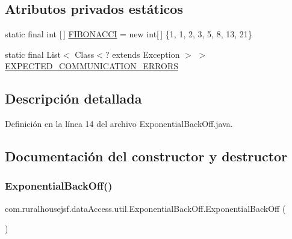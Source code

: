\subsection*{Atributos privados estáticos}
\begin{DoxyCompactItemize}
\item 
static final int \mbox{[}$\,$\mbox{]} \mbox{\hyperlink{classcom_1_1ruralhousejsf_1_1data_access_1_1util_1_1_exponential_back_off_aa65d2215973a1a6aa71bdbfa80b7cef8}{F\+I\+B\+O\+N\+A\+C\+CI}} = new int\mbox{[}$\,$\mbox{]} \{1, 1, 2, 3, 5, 8, 13, 21\}
\item 
static final List$<$ Class$<$? extends Exception $>$ $>$ \mbox{\hyperlink{classcom_1_1ruralhousejsf_1_1data_access_1_1util_1_1_exponential_back_off_a0f2932219cfe361f790b6d456ac68e1e}{E\+X\+P\+E\+C\+T\+E\+D\+\_\+\+C\+O\+M\+M\+U\+N\+I\+C\+A\+T\+I\+O\+N\+\_\+\+E\+R\+R\+O\+RS}}
\end{DoxyCompactItemize}


\subsection{Descripción detallada}


Definición en la línea 14 del archivo Exponential\+Back\+Off.\+java.



\subsection{Documentación del constructor y destructor}
\mbox{\label{classcom_1_1ruralhousejsf_1_1data_access_1_1util_1_1_exponential_back_off_ac6546eba6d6286cb32074d4f3471296d}} 
\subsubsection{\texorpdfstring{ExponentialBackOff()}{ExponentialBackOff()}}
{\footnotesize\ttfamily com.\+ruralhousejsf.\+data\+Access.\+util.\+Exponential\+Back\+Off.\+Exponential\+Back\+Off (\begin{DoxyParamCaption}{ }\end{DoxyParamCaption})\hspace{0.3cm}{\ttfamily [private]}}



